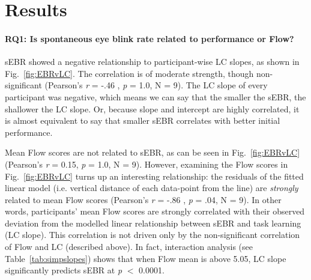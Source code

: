 \documentclass[10pt,letterpaper,floatsintext]{article}
\begin{document}

\section{Results}

\paragraph{RQ1: Is spontaneous eye blink rate related to performance or Flow?}

sEBR showed a negative relationship to participant-wise LC slopes, as shown in Fig.~\ref{fig:EBRvLC}. The correlation is of moderate strength, though non-significant (Pearson's {\it r} = -.46 , {\it p} = 1.0, N = 9). %
The LC slope of every participant was negative, which means we can say that the smaller the sEBR, the shallower the LC slope. Or, because slope and intercept are highly correlated, it is almost equivalent to say that smaller sEBR correlates with better initial performance.

Mean Flow scores are not related to sEBR, as can be seen in Fig.~\ref{fig:EBRvLC} (Pearson's {\it r} = 0.15, {\it p} = 1.0, N = 9). %
However, examining the Flow scores in Fig.~\ref{fig:EBRvLC} turns up an interesting relationship: the residuals of the fitted linear model (i.e. vertical distance of each data-point from the line) are {\it strongly} related to mean Flow scores (Pearson's {\it r} = -.86 , {\it p} = .04, N = 9). %
In other words, participants' mean Flow scores are strongly correlated with their observed deviation from the modelled linear relationship between sEBR and task learning (LC slope). This correlation is not driven only by the non-significant correlation of Flow and LC (described above). In fact, interaction analysis (see Table~\ref{tab:simpslopes}) shows that when Flow mean is above 5.05, LC slope significantly predicts sEBR at {\it p} $<$ 0.0001.
\end{document}
